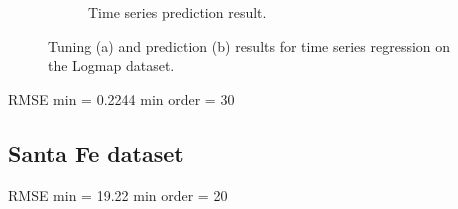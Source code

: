 \documentclass{article}
\begin{document}
\begin{figure}[h]
\begin{subfigure}[b]{0.4\textwidth}
                 \caption{Time series prediction result.}
                 \label{fig:logmap_prediction}
             \end{subfigure}
             \hspace{0.05\textwidth}
            \caption{Tuning (a) and prediction (b) results for time series regression on the Logmap dataset.}
        \end{figure}
    
        
        RMSE min =  0.2244
        min order = 30 
        
    \subsection{Santa Fe dataset}
        
        RMSE min =  19.22
        min order = 20
        
\end{document}
